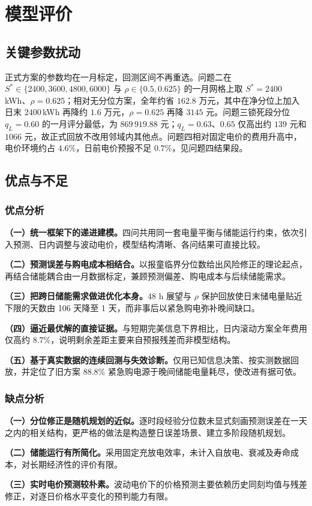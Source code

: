 \section{模型评价}

\subsection{关键参数扰动}

正式方案的参数均在一月标定，回测区间不再重选。问题二在 $S^{*}\in\{2400,3600,4800,6000\}$ 与 $\rho\in\{0.5,0.625\}$ 的一月网格上取 $S^{*}=2400$\,kWh、$\rho=0.625$；相对无分位方案，全年约省 $162.8$ 万元，其中在净分位上加入日末 $2400$\,kWh 再降约 $1.6$ 万元，$\rho=0.625$ 再降 $3145$ 元。问题三锁死段分位 $q_L=0.60$ 的一月评分最低，为 $869\,919.88$ 元；$q_L=0.63$、$0.65$ 仅高出约 $139$ 元和 $1066$ 元，故正式回放不改用邻域内其他点。问题四相对固定电价的费用升高中，电价环境约占 $4.6\%$，日前电价预报不足 $0.7\%$，见问题四结果段。

\subsection{优点与不足}

\subsubsection{优点分析}

\textbf{（一）统一框架下的递进建模。}四问共用同一套电量平衡与储能运行约束，依次引入预测、日内调整与波动电价，模型结构清晰、各问结果可直接比较。

\textbf{（二）预测误差与购电成本相结合。}以报童临界分位数给出风险修正的理论起点，再结合储能耦合由一月数据标定，兼顾预测偏差、购电成本与后续储能需求。

\textbf{（三）把跨日储能需求做进优化本身。}48 h 展望与 $\rho$ 保护回放使日末储电量贴近下限的天数由 106 天降至 1 天，而非事后以紧急购电弥补晚间缺口。

\textbf{（四）逼近最优解的直接证据。}与短期完美信息下界相比，日内滚动方案全年费用仅高约 $8.7\%$，说明剩余差距主要来自预报残差而非模型结构。

\textbf{（五）基于真实数据的连续回测与失效诊断。}仅用已知信息决策、按实测数据回放，并定位了旧方案 $88.8\%$ 紧急购电源于晚间储能电量耗尽，使改进有据可依。
\subsubsection{缺点分析}

\textbf{（一）分位修正是随机规划的近似。}逐时段经验分位数未显式刻画预测误差在一天之内的相关结构，更严格的做法是构造整日误差场景、建立多阶段随机规划。

\textbf{（二）储能运行有所简化。}采用固定充放电效率，未计入自放电、衰减及寿命成本，对长期经济性的评价有限。

\textbf{（三）实时电价预测较朴素。}波动电价下的价格预测主要依赖历史同刻均值与残差修正，对逐日价格水平变化的预判能力有限。
